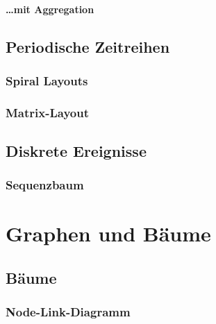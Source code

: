                 \paragraph{\dots mit Aggregation} %

        \subsection{Periodische Zeitreihen} %

            \subsubsection{Spiral Layouts} %

            \subsubsection{Matrix-Layout} %

        \subsection{Diskrete Ereignisse} %

            \subsubsection{Sequenzbaum} %

    \section{Graphen und Bäume} %

        \subsection{Bäume} %

            \subsubsection{Node-Link-Diagramm} %

